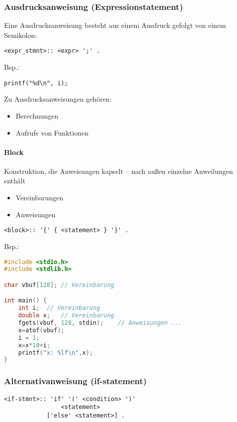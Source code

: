 \subsubsection[Ausdrucksanweisung]{Ausdrucksanweisung (Expressionstatement)}
Eine Ausdrucksanweisung besteht aus einem Ausdruck gefolgt von einem Semikolon:
\begin{lstlisting}
<expr_stmnt>:: <expr> ';' .
\end{lstlisting}

Bsp.:
\begin{lstlisting}
printf("%d\n", i);
\end{lstlisting}
Zu Ausdrucksanweisungen gehören:
\begin{itemize}
\item Berechnungen
\item Aufrufe von Funktionen
\end{itemize}

\paragraph{Block}
Konstruktion, die Anweisungen kapselt -- nach außen einzelne Anweilungen enthält
\begin{itemize}
\item Vereinbarungen
\item Anweisungen
\end{itemize}
\begin{lstlisting}
<block>:: '{' { <statement> } '}' .
\end{lstlisting}

Bsp.:
\begin{lstlisting}[language=C]
#include <stdio.h>
#include <stdlib.h>

char vbuf[128];	// Vereinbarung

int main() {
	int i;	// Vereinbarung
	double x;	// Vereinbarung
	fgets(vbuf, 128, stdin);	// Anweisungen ...
	x=atof(vbuf);
	i = 1;
	x=x*10+i;
	printf("x: %lf\n",x);
}
\end{lstlisting}

\subsubsection[Alternativanweisung]{Alternativanweisung (if-statement)}

\begin{lstlisting}
<if-stmnt>:: 'if' '(' <condition> ')' 
				<statement>
			['else' <statement>] .
\end{lstlisting}

